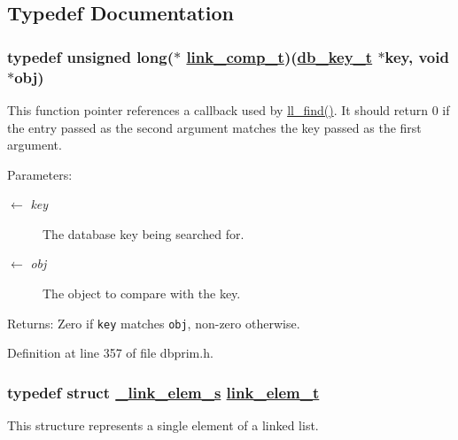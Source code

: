 \subsection{Typedef Documentation}
\hypertarget{group__dbprim__link_ga3}{
\subsubsection[link\_\-comp\_\-t]{\setlength{\rightskip}{0pt plus 5cm}typedef unsigned long($\ast$ \hyperlink{group__dbprim__link_ga3}{link\_\-comp\_\-t})(\hyperlink{struct__db__key__s}{db\_\-key\_\-t} $\ast$key, void $\ast$obj)}}
\label{group__dbprim__link_ga3}


This function pointer references a callback used by \hyperlink{group__dbprim__link_ga9}{ll\_\-find()}. It should return 0 if the entry passed as the second argument matches the key passed as the first argument.

\begin{Desc}
\item[Parameters:]
\begin{description}
\item[\mbox{$\leftarrow$} {\em key}]The database key being searched for. \item[\mbox{$\leftarrow$} {\em obj}]The object to compare with the key.\end{description}
\end{Desc}
\begin{Desc}
\item[Returns:]Zero if {\tt key} matches {\tt obj}, non-zero otherwise.\end{Desc}


Definition at line 357 of file dbprim.h.\hypertarget{group__dbprim__link_ga1}{
\subsubsection[link\_\-elem\_\-t]{\setlength{\rightskip}{0pt plus 5cm}typedef struct \hyperlink{struct__link__elem__s}{\_\-link\_\-elem\_\-s} \hyperlink{struct__link__elem__s}{link\_\-elem\_\-t}}}
\label{group__dbprim__link_ga1}


This structure represents a single element of a linked list.

